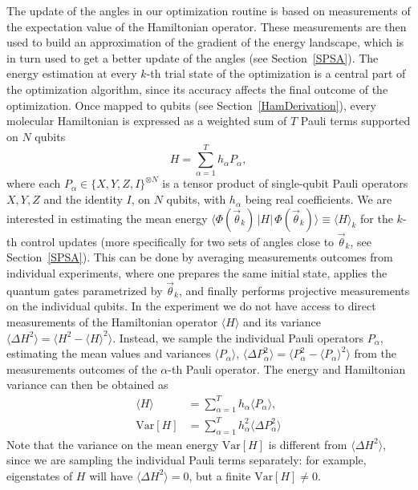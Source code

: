 \documentclass[twocolumn]{revtex4-1}
\newcommand{\1}{\mathbbm{1}}
\newcommand{\ket}[1]{ | \, #1 \rangle}
\newcommand{\bra}[1]{ \langle #1 \,  |}
\begin{document}
The update of the angles in our optimization routine is based on measurements of the expectation value of the Hamiltonian operator. These measurements are then used 
to build an approximation of the gradient of the energy landscape, which is in turn used to get a better update of the angles (see Section~\ref{SPSA}). The energy estimation at every $k$-th trial state of the optimization is a central 
part of the optimization algorithm, since its accuracy affects the final outcome of the optimization. 
Once mapped to qubits (see Section~\ref{HamDerivation}), every molecular Hamiltonian is expressed as a weighted sum of $T$ Pauli terms supported on $N$ qubits
\begin{equation}
\label{Hq}
H=\sum_{\alpha=1}^T h_\alpha P_\alpha,
\end{equation}
where each $P_\alpha\in \{X,Y,Z,I\}^{\otimes N}$ is a tensor product of single-qubit Pauli operators $X,Y,Z$ and the identity $I$, on $N$ qubits, with $h_\alpha$ being real coefficients.  
We are interested in estimating the mean energy $\bra{\Phi(\vec{\theta}_k)}H\ket{\Phi(\vec{\theta}_k)}\equiv\langle H\rangle_k$ for the $k$-th control updates (more specifically for two sets of angles close to $\vec\theta_k$, see Section~\ref{SPSA}). This can be done by averaging measurements outcomes from individual experiments, where one prepares the same initial state, applies the quantum gates parametrized by $\vec \theta_k$, and finally performs projective measurements on the individual qubits.
In the experiment we do not have access to direct measurements of the Hamiltonian operator $\langle H \rangle$ and its variance $\langle \Delta H^2\rangle=\langle H^2 -\langle H \rangle^2\rangle$. Instead, we sample the individual Pauli operators $P_\alpha$, estimating the mean values and variances $\langle P_\alpha \rangle$, $\langle \Delta P_\alpha^2\rangle=\langle P_\alpha^2-\langle P_\alpha\rangle^2\rangle$ from the measurements outcomes of the $\alpha$-th Pauli operator. The energy and Hamiltonian variance can then be obtained as 
\begin{align}
\label{MeanH}
\langle  H \rangle&=\sum_{\alpha=1}^T h_\alpha \langle P_\alpha \rangle,\\
\textrm{Var}[ H ]&=\sum_{\alpha=1}^T h_\alpha^2 \langle\Delta P_\alpha^2\rangle
\end{align}
Note that the variance on the mean energy $\textrm{Var}[{ H }]$ is different from ${\langle \Delta H^2 \rangle}$, since we are sampling the individual Pauli terms separately: for example, eigenstates of $H$ will have ${\langle \Delta H^2 \rangle}=0$, but a finite $\textrm{Var}[{ H }]\neq0$.
\end{document}
